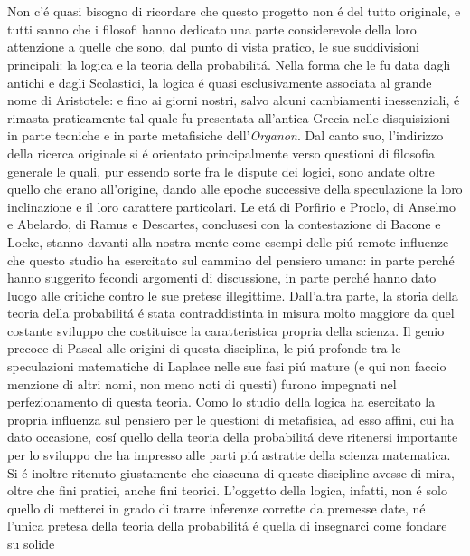 \section{}
Non c'\'{e} quasi bisogno di ricordare che questo progetto non \'{e} del tutto originale, e tutti sanno che i filosofi hanno dedicato una parte considerevole della loro attenzione
a quelle che sono, dal punto di vista pratico, le sue suddivisioni principali: la logica e la teoria della probabilit\'{a}. Nella forma che le fu data dagli antichi e dagli Scolastici,
la logica \'{e} quasi esclusivamente associata al grande nome di Aristotele: e fino ai giorni nostri, salvo alcuni cambiamenti inessenziali, \'{e} rimasta praticamente tal quale fu
presentata all'antica Grecia nelle disquisizioni in parte tecniche e in parte metafisiche dell'\textit{Organon}. Dal canto suo, l'indirizzo della ricerca originale si \'{e} orientato
principalmente verso questioni di filosofia generale le quali, pur essendo sorte fra le dispute dei logici, sono andate oltre quello che erano all'origine, dando alle epoche successive
della speculazione la loro inclinazione e il loro carattere particolari. Le et\'{a} di Porfirio e Proclo, di Anselmo e Abelardo, di Ramus e Descartes, conclusesi con la contestazione
di Bacone e Locke, stanno davanti alla nostra mente come esempi delle pi\'{u} remote influenze che questo studio ha esercitato sul cammino del pensiero umano: in parte perch\'{e} hanno
suggerito fecondi argomenti di discussione, in parte perch\'{e} hanno dato luogo alle critiche contro le sue pretese illegittime. Dall'altra parte, la storia della teoria della
probabilit\'{a} \'{e} stata contraddistinta in misura molto maggiore da quel costante sviluppo che costituisce la caratteristica propria della scienza. Il genio precoce di Pascal alle origini
di questa disciplina, le pi\'{u} profonde tra le speculazioni matematiche di Laplace nelle sue fasi pi\'{u} mature (e qui non faccio menzione di altri nomi, non meno noti di questi)
furono impegnati nel perfezionamento di questa teoria. Como lo studio della logica ha esercitato la propria influenza sul pensiero per le questioni di metafisica, ad esso affini,
cui ha dato occasione, cos\'{i} quello della teoria della probabilit\'{a} deve ritenersi importante per lo sviluppo che ha impresso alle parti pi\'{u} astratte della scienza matematica.
Si \'{e} inoltre ritenuto giustamente che ciascuna di queste discipline avesse di mira, oltre che fini pratici, anche fini teorici. L'oggetto della logica, infatti, non \'{e} solo
quello di metterci in grado di trarre inferenze corrette da premesse date, n\'{e} l'unica pretesa della teoria della probabilit\'{a} \'{e} quella di insegnarci come fondare su solide
